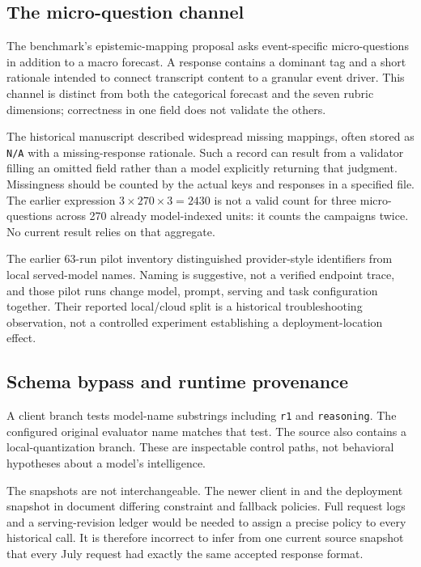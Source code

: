 \subsection{The micro-question channel}
\label{sec:epistemic_mapping}
The benchmark's epistemic-mapping proposal asks event-specific micro-questions in addition to a macro forecast. A response contains a dominant tag and a short rationale intended to connect transcript content to a granular event driver. This channel is distinct from both the categorical forecast and the seven rubric dimensions; correctness in one field does not validate the others.

The historical manuscript described widespread missing mappings, often stored as \texttt{N/A} with a missing-response rationale. Such a record can result from a validator filling an omitted field rather than a model explicitly returning that judgment. Missingness should be counted by the actual keys and responses in a specified file. The earlier expression $3\times270\times3=2430$ is not a valid count for three micro-questions across 270 already model-indexed units: it counts the campaigns twice. No current result relies on that aggregate.

The earlier 63-run pilot inventory distinguished provider-style identifiers from local served-model names. Naming is suggestive, not a verified endpoint trace, and those pilot runs change model, prompt, serving and task configuration together. Their reported local/cloud split is a historical troubleshooting observation, not a controlled experiment establishing a deployment-location effect.

\subsection{Schema bypass and runtime provenance}
A client branch tests model-name substrings including \texttt{r1} and \texttt{reasoning}. The configured original evaluator name matches that test. The source also contains a local-quantization branch. These are inspectable control paths, not behavioral hypotheses about a model's intelligence.

The snapshots are not interchangeable. The newer client in
 and the deployment snapshot
in 
document differing constraint and fallback policies. Full request logs and a serving-revision ledger would be needed to assign a precise policy to every historical call. It is therefore incorrect to infer from one current source snapshot that every July request had exactly the same accepted response format.

